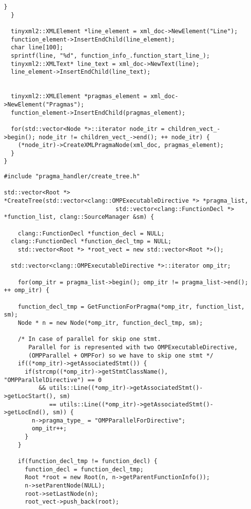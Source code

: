 \documentclass[a4paper,11pt,twoside]{book}
\begin{document}
\begin{lstlisting}[language=CCC, caption=pragma\_handler/Root.cpp]
    }
  }

  tinyxml2::XMLElement *line_element = xml_doc->NewElement("Line");
  function_element->InsertEndChild(line_element); 
  char line[100];
  sprintf(line, "%d", function_info_.function_start_line_);
  tinyxml2::XMLText* line_text = xml_doc->NewText(line);
  line_element->InsertEndChild(line_text);


  tinyxml2::XMLElement *pragmas_element = xml_doc->NewElement("Pragmas");
  function_element->InsertEndChild(pragmas_element);

  for(std::vector<Node *>::iterator node_itr = children_vect_->begin(); node_itr != children_vect_->end(); ++ node_itr) {
    (*node_itr)->CreateXMLPragmaNode(xml_doc, pragmas_element);
  }
}
\end{lstlisting}

\begin{lstlisting}[language=CCC, caption=pragma\_handler/create\_tree.cpp]
#include "pragma_handler/create_tree.h"

std::vector<Root *> *CreateTree(std::vector<clang::OMPExecutableDirective *> *pragma_list,
								std::vector<clang::FunctionDecl *> *function_list, clang::SourceManager &sm) {

	clang::FunctionDecl *function_decl = NULL;
  clang::FunctionDecl *function_decl_tmp = NULL;
	std::vector<Root *> *root_vect = new std::vector<Root *>();

  std::vector<clang::OMPExecutableDirective *>::iterator omp_itr;

	for(omp_itr = pragma_list->begin(); omp_itr != pragma_list->end(); ++ omp_itr) {    

    function_decl_tmp = GetFunctionForPragma(*omp_itr, function_list, sm);
    Node * n = new Node(*omp_itr, function_decl_tmp, sm);

    /* In case of parallel for skip one stmt. 
       Parallel for is represented with two OMPExecutableDirective,
       (OMPParallel + OMPFor) so we have to skip one stmt */
    if((*omp_itr)->getAssociatedStmt()) {
      if(strcmp((*omp_itr)->getStmtClassName(), "OMPParallelDirective") == 0 
          && utils::Line((*omp_itr)->getAssociatedStmt()->getLocStart(), sm) 
             == utils::Line((*omp_itr)->getAssociatedStmt()->getLocEnd(), sm)) {
        n->pragma_type_ = "OMPParallelForDirective";
        omp_itr++;
      }
    }

    if(function_decl_tmp != function_decl) {
      function_decl = function_decl_tmp;
      Root *root = new Root(n, n->getParentFunctionInfo());
      n->setParentNode(NULL);
      root->setLastNode(n);
      root_vect->push_back(root);


\end{lstlisting}
\end{document}
